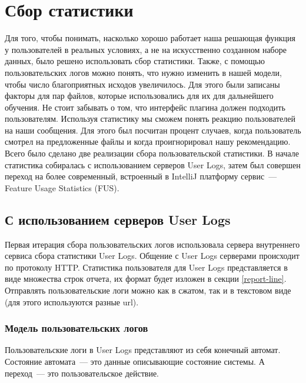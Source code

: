 \section{Сбор статистики}\label{stats-main}
Для того, чтобы понимать, насколько хорошо работает наша решающая функция у пользователей в реальных условиях, а не на искусственно созданном наборе данных, было решено использовать сбор статистики. Также, с помощью пользовательских логов можно понять, что нужно изменить в нашей модели, чтобы число благоприятных исходов увеличилось. Для этого были записаны факторы для пар файлов, которые использовались для их для дальнейшего обучения. Не стоит забывать о том, что интерфейс плагина должен подходить пользователям. Используя статистику мы сможем понять реакцию пользователей на наши сообщения. Для этого был посчитан процент случаев, когда пользователь смотрел на предложенные файлы и когда проигнорировал нашу рекомендацию. Всего было сделано две реализации сбора пользовательской статистики. В начале статистика собиралась с использованием серверов User Logs, затем был совершен переход на более современный, встроенный в IntelliJ платформу сервис~--- Feature Usage Statistics (FUS).
\subsection{С использованием серверов User Logs}
Первая итерация сбора пользовательских логов использовала сервера внутреннего сервиса сбора статистики User Logs. Общение с User Logs серверами происходит по протоколу HTTP. Статистика пользователя для User Logs представляется в виде множества строк отчета, их формат будет изложен в секции \ref{report-line}. Отправлять пользовательские логи можно как в сжатом, так и в текстовом виде (для этого используются разные url).
\subsubsection{Модель пользовательских логов}
Пользовательские логи в User Logs представляют из себя конечный автомат. Состояние автомата~--- это данные описывающие состояние системы. А переход~--- это пользовательское действие.
